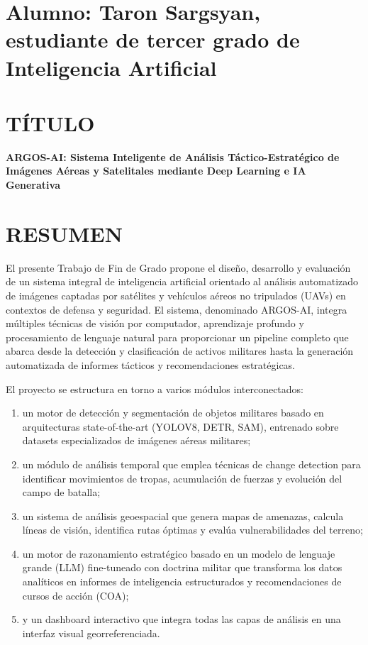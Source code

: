 \documentclass[12pt, a4paper]{article}
\begin{document}
\section*{Alumno: Taron Sargsyan, estudiante de tercer grado de Inteligencia Artificial}

\vspace{4\baselineskip}

\section*{TÍTULO} 

\textbf{ARGOS-AI: Sistema Inteligente de Análisis Táctico-Estratégico de Imágenes Aéreas y Satelitales mediante Deep Learning e IA Generativa} 

\section*{RESUMEN} 

El presente Trabajo de Fin de Grado propone el diseño, desarrollo y evaluación de un sistema integral de inteligencia artificial orientado al análisis automatizado de imágenes captadas por satélites y vehículos aéreos no tripulados (UAVs) en contextos de defensa y seguridad. El sistema, denominado ARGOS-AI, integra múltiples técnicas de visión por computador, aprendizaje profundo y procesamiento de lenguaje natural para proporcionar un pipeline completo que abarca desde la detección y clasificación de activos militares hasta la generación automatizada de informes tácticos y recomendaciones estratégicas.

El proyecto se estructura en torno a varios módulos interconectados: 
\begin{enumerate}[label=(\arabic*)]
    \item un motor de detección y segmentación de objetos militares basado en arquitecturas state-of-the-art (YOLOV8, DETR, SAM), entrenado sobre datasets especializados de imágenes aéreas militares; 
    \item un módulo de análisis temporal que emplea técnicas de change detection para identificar movimientos de tropas, acumulación de fuerzas y evolución del campo de batalla; 
    \item un sistema de análisis geoespacial que genera mapas de amenazas, calcula líneas de visión, identifica rutas óptimas y evalúa vulnerabilidades del terreno; 
    \item un motor de razonamiento estratégico basado en un modelo de lenguaje grande (LLM) fine-tuneado con doctrina militar que transforma los datos analíticos en informes de inteligencia estructurados y recomendaciones de cursos de acción (COA); 
    \item y un dashboard interactivo que integra todas las capas de análisis en una interfaz visual georreferenciada. 
\end{enumerate}
\end{document}
